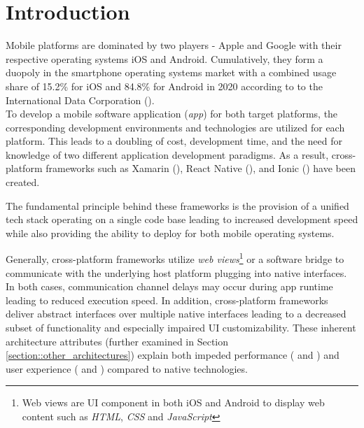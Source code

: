 \chapter{Introduction}
\label{section:introduction}
Mobile platforms are dominated by two players - Apple and Google with their respective operating systems iOS and Android. 
Cumulatively, they form a duopoly in the smartphone operating systems market with a combined usage share of 
15.2\% for iOS and 84.8\% for Android in 2020 according to to the International Data Corporation (\cite{IDC2021}).
\\To develop a mobile software application (\textit{app}) for both target platforms, the corresponding development environments and technologies 
are utilized for each platform. This leads to a doubling of cost, development time, and 
the need for knowledge of two different application development paradigms. 
As a result, cross-platform frameworks such as Xamarin (\cite{Xamarin2021}), React Native (\cite{Facebook2021}), and Ionic (\cite{Ionic2021}) have been created. 

The fundamental principle behind these frameworks is the provision of a unified tech stack operating on a single code base leading to increased development speed
while also providing the ability to deploy for both mobile operating systems.

Generally, cross-platform frameworks utilize \textit{web views}\footnote{Web views are UI component in both iOS and Android to display web content such as \textit{HTML}, \textit{CSS} and \textit{JavaScript}} or a software bridge to communicate with the underlying host platform plugging into 
native interfaces. In both cases, communication channel delays may occur during app runtime leading to reduced execution speed. In addition, 
cross-platform frameworks deliver abstract interfaces over multiple native interfaces leading to a decreased subset of functionality
and especially impaired UI customizability. These inherent architecture attributes (further examined in Section \ref{section::other_architectures}) explain
both impeded performance (\cite{Ebone2018} and \cite{Corbalan2019}) and user experience (\cite{Mercado2016} and \cite{Angulo2014}) compared to native technologies.

